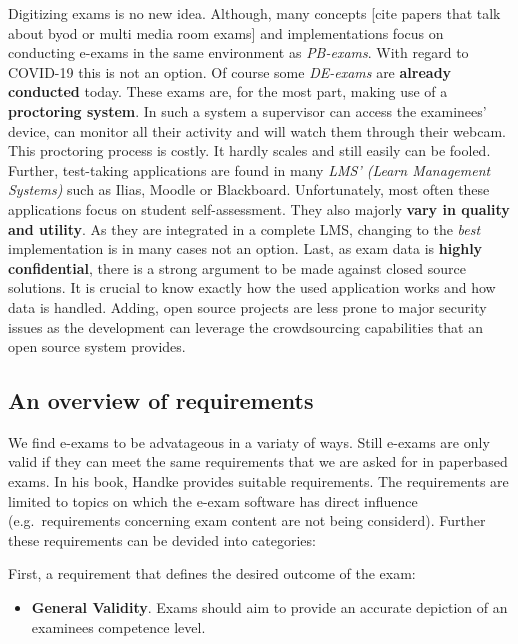Digitizing exams is no new idea. Although, many concepts {[}cite papers
that talk about byod or multi media room exams{]} and implementations
focus on conducting e-exams in the same environment as \emph{PB-exams}.
With regard to COVID-19 this is not an option. Of course some
\emph{DE-exams} are \textbf{already conducted} today. These exams are,
for the most part, making use of a \textbf{proctoring system}. In such a
system a supervisor can access the examinees' device, can monitor all
their activity and will watch them through their webcam. This proctoring
process is costly. It hardly scales and still easily can be fooled.
Further, test-taking applications are found in many \emph{LMS' (Learn
Management Systems)} such as Ilias, Moodle or Blackboard. Unfortunately,
most often these applications focus on student self-assessment. They
also majorly \textbf{vary in quality and utility}. As they are
integrated in a complete LMS, changing to the \emph{best} implementation
is in many cases not an option. Last, as exam data is \textbf{highly
confidential}, there is a strong argument to be made against closed
source solutions. It is crucial to know exactly how the used application
works and how data is handled. Adding, open source projects are less
prone to major security issues as the development can leverage the
crowdsourcing capabilities that an open source system provides.

\hypertarget{an-overview-of-requirements}{%
\subsection{An overview of
requirements}\label{an-overview-of-requirements}}

We find e-exams to be advatageous in a variaty of ways. Still e-exams
are only valid if they can meet the same requirements that we are asked
for in paperbased exams. In his book, Handke provides suitable
requirements. The requirements are limited to topics on which the e-exam
software has direct influence (e.g.~requirements concerning exam content
are not being considerd). Further these requirements can be devided into
categories:

First, a requirement that defines the desired outcome of the exam:

\begin{itemize}
\tightlist
\item
  \textbf{General Validity}. Exams should aim to provide an accurate
  depiction of an examinees competence level.
\end{itemize}

